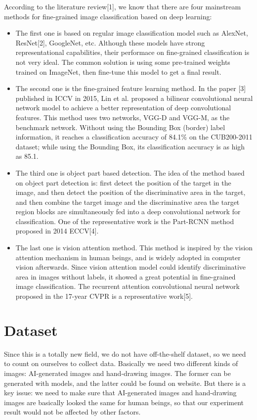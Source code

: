 \documentclass[conference]{IEEEtran}
\begin{document}
According to the literature review[1], we know that there are four mainstream methods for fine-grained image classification based on deep learning:
\begin{itemize}
    \item The first one is based on regular image classification model such as AlexNet, ResNet[2], GoogleNet, etc. Although these models have strong representational capabilities, their performace on fine-grained classification is not very ideal. The common solution is using some pre-trained weights trained on ImageNet, then fine-tune this model to get a final result.    
    \item The second one is the fine-grained feature learning method. In the paper [3] published in ICCV in 2015, Lin et al. proposed a bilinear convolutional neural network model to achieve a better representation of deep convolutional features. This method uses two networks, VGG-D and VGG-M, as the benchmark network. Without using the Bounding Box (border) label information, it reaches a classification accuracy of 84.1\% on the CUB200-2011 dataset; while using the Bounding Box, its classification accuracy is as high as 85.1.
    \item The third one is object part based detection. The idea of the method based on object part detection is: first detect the position of the target in the image, and then detect the position of the discriminative area in the target, and then combine the target image and the discriminative area the target region blocks are simultaneously fed into a deep convolutional network for classification. One of the representative work is the Part-RCNN method proposed in 2014 ECCV[4].
    \item The last one is vision attention method. This method is inspired by the vision attention mechanism in human beings, and is widely adopted in computer vision afterwards. Since vision attention model could identify discriminative area in images without labels, it showed a great potential in fine-grained image classification. The recurrent attention convolutional neural network proposed in the 17-year CVPR is a representative work[5].
\end{itemize}

\section{Dataset}

Since this is a totally new field, we do not have off-the-shelf dataset, so we need to count on ourselves to collect data. Basically we need two different kinds of images: AI-generated images and
hand-drawing images. The former can be generated with models, and the latter could be found on website. But there is a key issue: we need to make sure that AI-generated images and hand-drawing images
are basically looked the same for human beings, so that our experiment result would not be affected by other factors.
\end{document}
